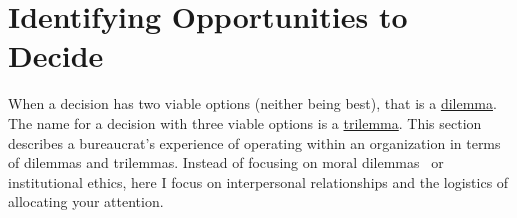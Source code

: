 \section{Identifying Opportunities to Decide\label{sec:dilemma-trilemma}}



When a decision has two viable options (neither being best), that is a \href{https://en.wikipedia.org/wiki/Dilemma}{dilemma}. 
The name for a decision with three viable options is a \href{https://en.wikipedia.org/wiki/Trilemma}{trilemma}. 
This section describes a bureaucrat's experience of operating within an organization in terms of dilemmas and trilemmas. Instead of focusing on moral dilemmas~\cite{2017_Zacka} or institutional ethics, here I focus on interpersonal relationships and the logistics of allocating your attention. 

